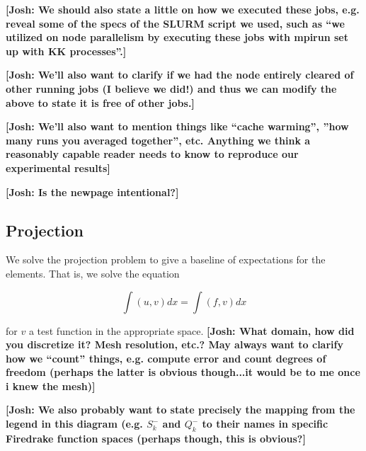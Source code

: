\documentclass[manuscript,screen]{acmart}
\newcommand\josh[1]{\textbf{\textcolor[rgb]{0,.5,1}{[Josh: #1]}}}
\begin{document}
\josh{We should also state a little on how we executed these jobs, e.g. reveal some of the specs of the SLURM script we used, such as ``we utilized on node parallelism by executing these jobs with mpirun set up with KK processes''.}

\josh{We'll also want to clarify if we had the node entirely cleared of other running jobs (I believe we did!) and thus we can modify the above to state it is free of other jobs.}

\josh{We'll also want to mention things like ``cache warming'', ''how many runs you averaged together'', etc.  Anything we think a reasonably capable reader needs to know to reproduce our experimental results}

\josh{Is the newpage intentional?}

\newpage


  \subsection{Projection}
  
  We solve the projection problem to give a baseline of expectations for the elements.  That is, we solve the equation 
  
  \begin{equation}
      \int (u, v) dx = \int (f, v) dx
  \end{equation}

 \noindent for $v$ a test function in the appropriate space.  \josh{What domain, how did you discretize it?  Mesh resolution, etc.?  May always want to clarify how we ``count'' things, e.g. compute error and count degrees of freedom (perhaps the latter is obvious though...it would be to me once i knew the mesh)}  

\josh{We also probably want to state precisely the mapping from the legend in this diagram (e.g. $S^-_k$ and $Q^-_k$ to their names in specific Firedrake function spaces (perhaps though, this is obvious?}
\end{document}
